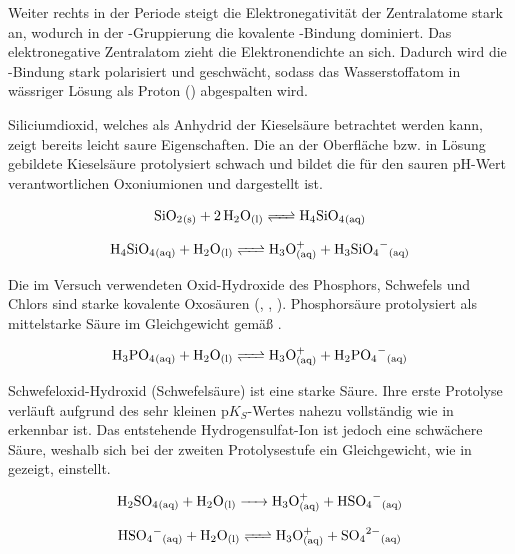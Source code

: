 Weiter rechts in der Periode steigt die Elektronegativität der Zentralatome stark an, wodurch in der -Gruppierung die kovalente -Bindung dominiert. Das elektronegative Zentralatom zieht die Elektronendichte an sich. Dadurch wird die -Bindung stark polarisiert und geschwächt, sodass das Wasserstoffatom in wässriger Lösung als Proton () abgespalten wird.

Siliciumdioxid, welches als Anhydrid der Kieselsäure betrachtet werden kann, zeigt bereits leicht saure Eigenschaften. Die an der Oberfläche bzw. in Lösung gebildete Kieselsäure protolysiert schwach und bildet die für den sauren pH-Wert verantwortlichen Oxoniumionen  und  dargestellt ist.

\begin{equation}
    \ce{SiO2_{(s)} + 2H2O_{(l)} <=> H4SiO4_{(aq)}}
    \label{eq:silicic_acid}
\end{equation}

\begin{equation}
    \ce{H4SiO4_{(aq)} + H2O_{(l)} <=> H3O^+_{(aq)} + H3SiO4^-_{(aq)}}
    \label{eq:silicic_acid_protolyse}
\end{equation}

Die im Versuch verwendeten Oxid-Hydroxide des Phosphors, Schwefels und Chlors sind starke kovalente Oxosäuren (, , ). Phosphorsäure protolysiert als mittelstarke Säure im Gleichgewicht gemäß .

\begin{equation}
    \ce{H3PO4_{(aq)} + H2O_{(l)} <=> H3O^+_{(aq)} + H2PO4^-_{(aq)}}
    \label{eq:phosphorsaure}
\end{equation}

Schwefeloxid-Hydroxid (Schwefelsäure) ist eine starke Säure. Ihre erste Protolyse verläuft aufgrund des sehr kleinen p$K_S$-Wertes nahezu vollständig wie in  erkennbar ist. Das entstehende Hydrogensulfat-Ion ist jedoch eine schwächere Säure, weshalb sich bei der zweiten Protolysestufe ein Gleichgewicht, wie in  gezeigt, einstellt.

\begin{equation}
    \ce{H2SO4_{(aq)} + H2O_{(l)} -> H3O^+_{(aq)} + HSO4^-_{(aq)}}
    \label{eq:schwefelsaure_1}
\end{equation}

\begin{equation}
    \ce{HSO4^-_{(aq)} + H2O_{(l)} <=> H3O^+_{(aq)} + SO4^{2-}_{(aq)}}
    \label{eq:schwefelsaure_2}
\end{equation}

